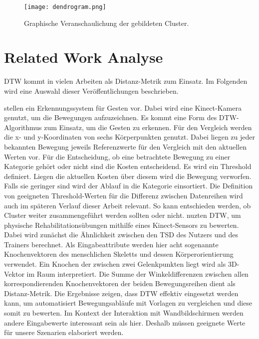 \begin{figure}[ht]
    \begin{center}
    \texttt{[image: dendrogram.png]}
    \end{center}
    \caption{Graphische Veranschaulichung der gebildeten Cluster.}
    \label{fig:Dendrogram}
\end{figure}


\section{Related Work Analyse}
\label{3-RelatedWork}
\ac{DTW} kommt in vielen Arbeiten als Distanz-Metrik zum Einsatz.
Im Folgenden wird eine Auswahl dieser Veröffentlichungen beschrieben.

\citet{wahyuni_motion_2021} stellen ein Erkennungssystem für Gesten vor.
Dabei wird eine Kinect-Kamera genutzt, um die Bewegungen aufzuzeichnen.
Es kommt eine Form des \ac{DTW}-Algorithmus zum Einsatz, um die Gesten zu erkennen.
Für den Vergleich werden die x- und y-Koordinaten von sechs Körperpunkten genutzt.
Dabei liegen zu jeder bekannten Bewegung jeweils Referenzwerte für den Vergleich mit den aktuellen Werten vor.
Für die Entscheidung, ob eine betrachtete Bewegung zu einer Kategorie gehört oder nicht sind die Kosten entscheidend.
Es wird ein Threshold definiert.
Liegen die aktuellen Kosten über diesem wird die Bewegung verworfen.
Falls sie geringer sind wird der Ablauf in die Kategorie einsortiert.
Die Definition von geeigneten Threshold-Werten für die Differenz zwischen Datenreihen
wird auch im späteren Verlauf dieser Arbeit relevant.
So kann entschieden werden, ob Cluster weiter zusammengeführt werden sollten oder nicht.
\citet{yu_dynamic_2019} nuzten \ac{DTW}, um physische Rehabilitationsübungen mithilfe eines Kinect-Sensors zu bewerten.
Dabei wird zunächst die Ähnlichkeit zwischen den \ac{TSD} des Nutzers und des Trainers berechnet.
Als Eingabeattribute werden hier acht sogenannte Knochenvektoren des menschlichen Skeletts und dessen Körperorientierung verwendet.
Ein Knochen der zwischen zwei Gelenkpunkten liegt wird als 3D-Vektor im Raum interpretiert.
Die Summe der Winkeldifferenzen zwischen allen korrespondierenden Knochenvektoren der beiden Bewegungsreihen dient
als Distanz-Metrik.
Die Ergebnisse zeigen, dass \ac{DTW} effektiv eingesetzt werden kann,
um automatisiert Bewegungsabläufe mit Vorlagen zu vergleichen und diese somit zu bewerten.
Im Kontext der Interaktion mit Wandbildschirmen werden andere Eingabewerte interessant sein als hier.
Deshalb müssen geeignete Werte für unsere Szenarien elaboriert werden.
